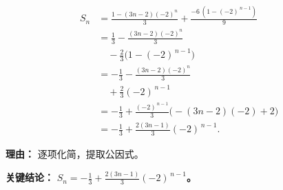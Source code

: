 \begin{examplebox}
\begin{description}[style=nextline, leftmargin=2.8em, labelsep=0.5em, itemsep=0.45em]
		\item[\textbf{第三步（化简求值）：}]
			\[
				\begin{aligned}
					S_n &= \frac{1 - (3n-2)(-2)^{n}}{3} + \frac{-6\,(1-(-2)^{\,n-1})}{9} \\
					&= \frac{1}{3} - \frac{(3n-2)(-2)^{n}}{3} \\
					&\quad - \frac{2}{3}\bigl(1-(-2)^{\,n-1}\bigr) \\
					&= -\frac{1}{3} - \frac{(3n-2)(-2)^{n}}{3} \\
					&\quad + \frac{2}{3}(-2)^{\,n-1} \\
					&= -\frac{1}{3} + \frac{(-2)^{\,n-1}}{3}\bigl(-(3n-2)(-2) + 2\bigr) \\
					&= -\frac{1}{3} + \frac{2(3n-1)}{3}(-2)^{\,n-1}.
			\end{aligned}
			\]
			\par\textbf{理由：} 逐项化简，提取公因式。
	\end{description}

	\textbf{\textcolor{CExample}{关键结论：}}
	\textbf{$S_n = -\frac{1}{3} + \frac{2(3n-1)}{3}(-2)^{\,n-1}$。}
\end{examplebox}
